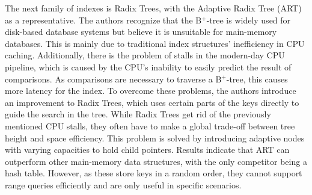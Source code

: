 The next family of indexes is Radix Trees, with the Adaptive Radix Tree (ART) \cite{Leis2013} as a representative. The authors recognize that the B$^+$-tree is widely used for disk-based database systems but believe it is unsuitable for main-memory databases. This is mainly due to traditional index structures' inefficiency in CPU caching. Additionally, there is the problem of stalls in the modern-day CPU pipeline, which is caused by the CPU's inability to easily predict the result of comparisons. As comparisons are necessary to  traverse a B$^+$-tree, this causes more latency for the index. To overcome these problems, the authors introduce an improvement to Radix Trees, which uses certain parts of the keys directly to guide the search in the tree. While Radix Trees get rid of the previously mentioned CPU stalls, they often have to make a global trade-off between tree height and space efficiency. This problem is solved by introducing adaptive nodes with varying capacities to hold child pointers. Results indicate that ART can outperform other main-memory data structures, with the only competitor being a hash table. However, as these store keys in a random order, they cannot support range queries efficiently and are only useful in specific scenarios.

